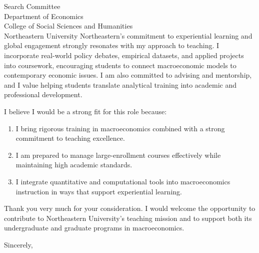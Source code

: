 \documentclass[11pt,letterpaper]{letter}
\begin{document}
\begin{letter}{
Search Committee \\
Department of Economics \\
College of Social Sciences and Humanities \\
Northeastern University
}
Northeastern’s commitment to experiential learning and global engagement strongly resonates with my approach to teaching. I incorporate real-world policy debates, empirical datasets, and applied projects into coursework, encouraging students to connect macroeconomic models to contemporary economic issues. I am also committed to advising and mentorship, and I value helping students translate analytical training into academic and professional development.

I believe I would be a strong fit for this role because:
\begin{enumerate}
    \item I bring rigorous training in macroeconomics combined with a strong commitment to teaching excellence.
    \item I am prepared to manage large-enrollment courses effectively while maintaining high academic standards.
    \item I integrate quantitative and computational tools into macroeconomics instruction in ways that support experiential learning.
\end{enumerate}

Thank you very much for your consideration. I would welcome the opportunity to contribute to Northeastern University’s teaching mission and to support both its undergraduate and graduate programs in macroeconomics.

\closing{Sincerely,}

\end{letter}
\end{document}
